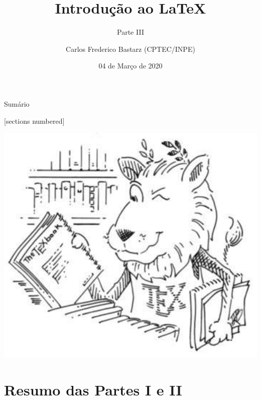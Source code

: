 \documentclass[10pt]{beamer}
\title{Introdução ao \LaTeX}
\subtitle{Parte III}
\date{04 de Março de 2020}
\author{Carlos Frederico Bastarz (CPTEC/INPE)}
\institute{Instituto Nacional de Pesquisas Espaciais (INPE)}
\begin{document}
\maketitle

\begin{frame}[c]{Sumário}
    \vspace{2em}
    \begin{multicols}{2}
        \begin{minipage}{0.49\textwidth}
           \vspace{12mm}
           [sections numbered]
           \tableofcontents[hideallsubsections]
        \end{minipage}
        \begin{minipage}{0.49\textwidth}
            \includegraphics[width=\textwidth]{./figs/ctan_lion_350x350.pdf}
        \end{minipage}
    \end{multicols}
\end{frame}

\section{Resumo das Partes I e II}
\end{document}
